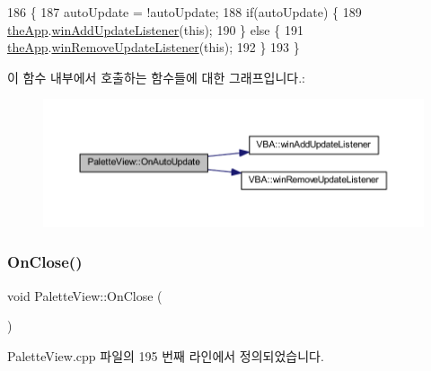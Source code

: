 \begin{DoxyCode}
186 \{
187   autoUpdate = !autoUpdate;
188   \textcolor{keywordflow}{if}(autoUpdate) \{
189     \mbox{\hyperlink{_v_b_a_8cpp_a8095a9d06b37a7efe3723f3218ad8fb3}{theApp}}.\mbox{\hyperlink{class_v_b_a_af0712f70a90d023ab8327a366be08174}{winAddUpdateListener}}(\textcolor{keyword}{this});
190   \} \textcolor{keywordflow}{else} \{
191     \mbox{\hyperlink{_v_b_a_8cpp_a8095a9d06b37a7efe3723f3218ad8fb3}{theApp}}.\mbox{\hyperlink{class_v_b_a_a2d31a0656df2230310aa8dc9e3a735d3}{winRemoveUpdateListener}}(\textcolor{keyword}{this});    
192   \}  
193 \}
\end{DoxyCode}
이 함수 내부에서 호출하는 함수들에 대한 그래프입니다.\+:
\nopagebreak
\begin{figure}[H]
\begin{center}
\leavevmode
\includegraphics[width=350pt]{class_palette_view_a4308e6a50e6b4870432bcb90c03f3c91_cgraph}
\end{center}
\end{figure}
\mbox{\label{class_palette_view_a58ce1d32d85fc8ee06f4e97948684cea}} 
\subsubsection{\texorpdfstring{On\+Close()}{OnClose()}}
{\footnotesize\ttfamily void Palette\+View\+::\+On\+Close (\begin{DoxyParamCaption}{ }\end{DoxyParamCaption})\hspace{0.3cm}{\ttfamily [protected]}}



Palette\+View.\+cpp 파일의 195 번째 라인에서 정의되었습니다.


